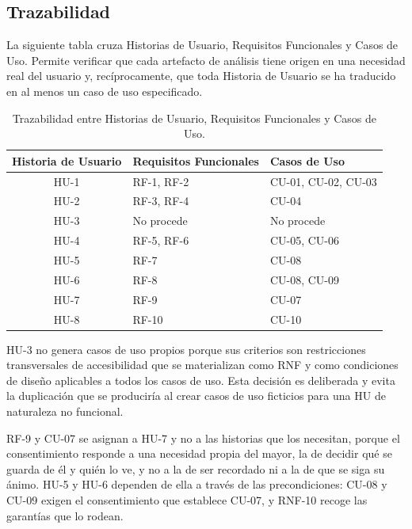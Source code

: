 \subsection{Trazabilidad}

La siguiente tabla cruza Historias de Usuario, Requisitos Funcionales y Casos de Uso. Permite verificar
que cada artefacto de análisis tiene origen en una necesidad real del usuario y, recíprocamente, que toda
Historia de Usuario se ha traducido en al menos un caso de uso especificado.

\begin{table}[htbp]
    \centering
    \begin{tabularx}{\textwidth}{@{}c >{\RaggedRight\arraybackslash}X >{\RaggedRight\arraybackslash}X@{}}
        \toprule
        \textbf{Historia de Usuario} & \textbf{Requisitos Funcionales} & \textbf{Casos de Uso} \\
        \midrule
        HU-1 & RF-1, RF-2                & CU-01, CU-02, CU-03 \\
        HU-2 & RF-3, RF-4                & CU-04 \\
        HU-3 & No procede                & No procede \\
        HU-4 & RF-5, RF-6                & CU-05, CU-06 \\
        HU-5 & RF-7                      & CU-08 \\
        HU-6 & RF-8                      & CU-08, CU-09 \\
        HU-7 & RF-9                      & CU-07 \\
        HU-8 & RF-10                     & CU-10 \\
        \bottomrule
    \end{tabularx}
    \caption{Trazabilidad entre Historias de Usuario, Requisitos Funcionales y Casos de Uso.}
    \label{tab:trazabilidad}
\end{table}

HU-3 no genera casos de uso propios porque sus criterios son restricciones transversales de accesibilidad
que se materializan como RNF y como condiciones de diseño aplicables a todos los casos de uso. Esta
decisión es deliberada y evita la duplicación que se produciría al crear casos de uso ficticios para una
HU de naturaleza no funcional.

RF-9 y CU-07 se asignan a HU-7 y no a las historias que los necesitan, porque el consentimiento responde a
una necesidad propia del mayor, la de decidir qué se guarda de él y quién lo ve, y no a la de ser recordado
ni a la de que se siga su ánimo. HU-5 y HU-6 dependen de ella a través de las precondiciones: CU-08 y CU-09
exigen el consentimiento que establece CU-07, y RNF-10 recoge las garantías que lo rodean.

